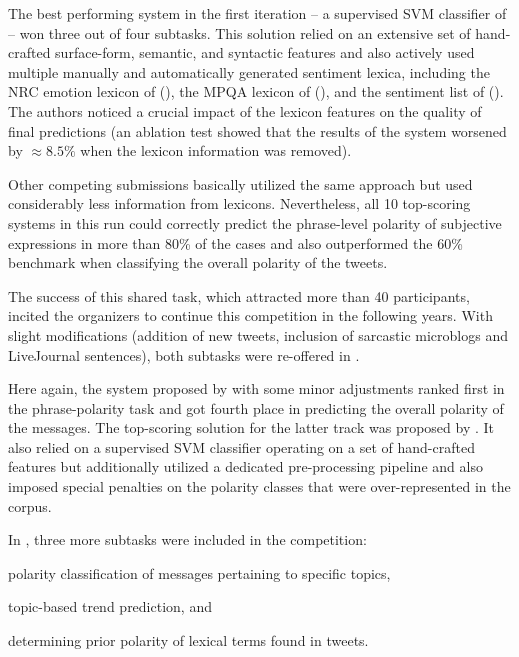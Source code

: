 The best performing system in the first iteration -- a supervised SVM
classifier of \citet{Mohammad:13} -- won three out of four subtasks.
This solution relied on an extensive set of hand-crafted surface-form,
semantic, and syntactic features and also actively used multiple
manually and automatically generated sentiment lexica, including the
NRC emotion lexicon of \citeauthor{Mohammad:13a}
(\citeyear{Mohammad:13a}), the MPQA lexicon of \citeauthor{Wilson:05}
(\citeyear{Wilson:05}), and the sentiment list of \citeauthor{Hu:04}
(\citeyear{Hu:04}).  The authors noticed a crucial impact of the
lexicon features on the quality of final predictions (an ablation test
showed that the results of the system worsened by $\approx8.5\%$ when
the lexicon information was removed).

Other competing submissions \cite{Becker:13,Guenther:13,Kokciyan:13}
basically utilized the same approach but used considerably less
information from lexicons.  Nevertheless, all 10 top-scoring systems
in this run could correctly predict the phrase-level polarity of
subjective expressions in more than 80\% of the cases and also
outperformed the 60\% benchmark when classifying the overall polarity
of the tweets.

The success of this shared task, which attracted more than 40
participants, incited the organizers to continue this competition in
the following years.  With slight modifications (addition of new
tweets, inclusion of sarcastic microblogs and LiveJournal sentences),
both subtasks were re-offered in \citeyear{Rosenthal:14}
\cite[see][]{Rosenthal:14}.

Here again, the system proposed by \citet{Mohammad:13} with some minor
adjustments \cite{Zhu:14} ranked first in the phrase-polarity task and
got fourth place in predicting the overall polarity of the messages.
The top-scoring solution for the latter track was proposed by
\citet{Miura:14}.  It also relied on a supervised SVM classifier
operating on a set of hand-crafted features but additionally utilized
a dedicated pre-processing pipeline and also imposed special penalties
on the polarity classes that were over-represented in the corpus.

In \citeyear{Rosenthal:15}, three more subtasks were included in the
competition:
\begin{inparaenum}[(i)]
  \item polarity classification of messages pertaining to specific
    topics,
  \item topic-based trend prediction, and
  \item determining prior polarity of lexical terms found in tweets.
\end{inparaenum}

